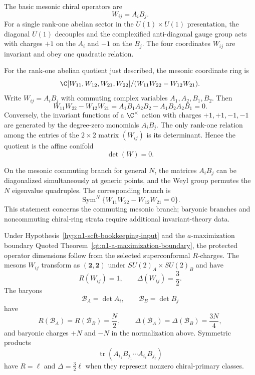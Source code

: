 The basic mesonic chiral operators are
\[
  W_{ij}=A_iB_j .
\]
For a single rank-one abelian sector in the \(U(1)\times U(1)\)
presentation, the diagonal \(U(1)\) decouples and the complexified
anti-diagonal gauge group acts with charges \(+1\) on the \(A_i\) and
\(-1\) on the \(B_j\).  The four coordinates \(W_{ij}\) are invariant and
obey one quadratic relation.

For the rank-one abelian quotient just described, the mesonic coordinate
ring is
\[
  \C[W_{11},W_{12},W_{21},W_{22}]
  /
  (W_{11}W_{22}-W_{12}W_{21}) .
\]
Write \(W_{ij}=A_iB_j\) with commuting complex variables
\(A_1,A_2,B_1,B_2\).  Then
\[
  W_{11}W_{22}-W_{12}W_{21}
  =
  A_1B_1A_2B_2-A_1B_2A_2B_1
  =
  0 .
\]
Conversely, the invariant functions of a \(\C^\times\) action with charges
\(+1,+1,-1,-1\) are generated by the degree-zero monomials \(A_iB_j\).  The
only rank-one relation among the entries of the \(2\times2\) matrix
\((W_{ij})\) is its determinant.  Hence the quotient is the affine conifold
\[
  \det(W)=0 .
\]

On the mesonic commuting branch for general \(N\), the matrices \(A_iB_j\)
can be diagonalized simultaneously at generic points, and the Weyl group
permutes the \(N\) eigenvalue quadruples.  The corresponding branch is
\[
  \operatorname{Sym}^N\{W_{11}W_{22}-W_{12}W_{21}=0\}.
\]
This statement concerns the commuting mesonic branch; baryonic branches and
noncommuting chiral-ring strata require additional invariant-theory data.

Under Hypothesis~\ref{hyp:n1-scft-bookkeeping-input} and the
\(a\)-maximization boundary
Quoted Theorem~\ref{qt:n1-a-maximization-boundary}, the protected operator
dimensions follow from the selected superconformal \(R\)-charges.  The mesons
\(W_{ij}\) transform as
\((\mathbf2,\mathbf2)\) under \(SU(2)_A\times SU(2)_B\) and have
\[
  R(W_{ij})=1,\qquad \Delta(W_{ij})=\frac32 .
\]
The baryons
\[
  \mathcal B_A=\det A_i,\qquad
  \mathcal B_B=\det B_j
\]
have
\[
  R(\mathcal B_A)=R(\mathcal B_B)=\frac N2,\qquad
  \Delta(\mathcal B_A)=\Delta(\mathcal B_B)=\frac{3N}{4},
\]
and baryonic charges \(+N\) and \(-N\) in the normalization above.
Symmetric products
\[
  \operatorname{tr}(A_{i_1}B_{j_1}\cdots A_{i_\ell}B_{j_\ell})
\]
have \(R=\ell\) and \(\Delta=\frac32\ell\) when they represent nonzero
chiral-primary classes.

